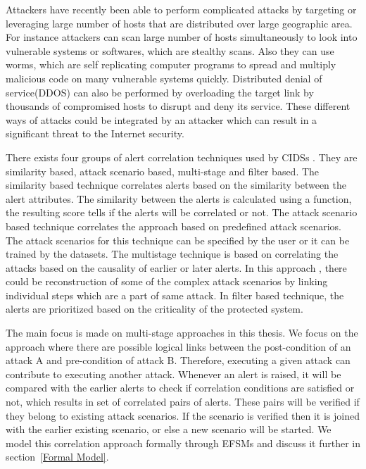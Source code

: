 \documentclass[article,msc=informatik,type=msc,colorback,accentcolor=tud9c]{tudthesis}
\begin{document}
	
	\vspace{3mm}
	Attackers have recently been able to perform complicated attacks by targeting or leveraging large number of hosts that are distributed over large geographic area. For instance attackers can scan large number of hosts simultaneously to look into vulnerable systems or softwares, which are stealthy scans. Also they can use worms, which are self replicating computer programs to spread and multiply malicious code on many vulnerable systems quickly. Distributed denial of service(\ac{DDOS}) can also be performed  by overloading the target link by thousands of compromised hosts to disrupt and deny its service. These different ways of attacks could be integrated by an attacker which can result in a significant threat to the Internet security.
	
	
	\vspace{3mm}
	There exists four groups of alert correlation techniques used by \ac{CIDS}s \cite{zhou2010survey}. They are similarity based, attack scenario based, multi-stage and filter based. The similarity based technique correlates alerts based on the similarity between the alert attributes. The similarity between the alerts is calculated using a function, the resulting score tells if the alerts will be correlated or not. The attack scenario based technique correlates the approach based on predefined attack scenarios. The attack scenarios for this technique can be specified by the user or it can be trained by the datasets. The multistage technique is based on correlating the attacks based on the causality of earlier or later alerts. In this approach , there could be reconstruction of some of the complex attack scenarios by linking individual steps which are a part of same attack. In filter based technique, the alerts are prioritized based on the criticality of the protected system.
	
	
	\vspace{3mm}
	The main focus is made on multi-stage approaches in this thesis. We focus on the approach where there are possible logical links between the post-condition of an attack A and pre-condition of attack B. Therefore, executing a given attack can contribute to executing another attack. Whenever an alert is raised, it will be compared with the earlier alerts to check if correlation conditions are satisfied or not, which results in set of correlated pairs of alerts. These pairs will be verified if they belong to existing attack scenarios. If the scenario is verified then it is joined with the earlier existing scenario, or else a new scenario will be started. We  model this correlation approach formally through \ac{EFSM}s and discuss it further in section~\ref{Formal Model}.	
	
\end{document}
